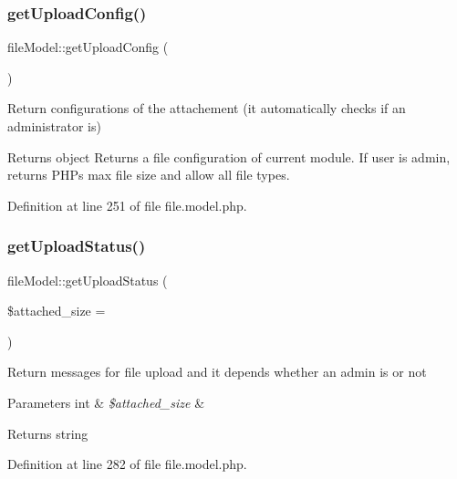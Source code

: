 \subsubsection{\texorpdfstring{get\+Upload\+Config()}{getUploadConfig()}}
{\footnotesize\ttfamily file\+Model\+::get\+Upload\+Config (\begin{DoxyParamCaption}{ }\end{DoxyParamCaption})}

Return configurations of the attachement (it automatically checks if an administrator is)

\begin{DoxyReturn}{Returns}
object Returns a file configuration of current module. If user is admin, returns P\+HP\textquotesingle{}s max file size and allow all file types. 
\end{DoxyReturn}


Definition at line 251 of file file.\+model.\+php.

\hypertarget{classfileModel_a63c3d6b41db33e55521cd3f0b10ab493}{}\label{classfileModel_a63c3d6b41db33e55521cd3f0b10ab493} 
\subsubsection{\texorpdfstring{get\+Upload\+Status()}{getUploadStatus()}}
{\footnotesize\ttfamily file\+Model\+::get\+Upload\+Status (\begin{DoxyParamCaption}\item[{}]{\$attached\+\_\+size = {} }\end{DoxyParamCaption})}

Return messages for file upload and it depends whether an admin is or not


\begin{DoxyParams}[1]{Parameters}
int & {\em \$attached\+\_\+size} & \\
\hline
\end{DoxyParams}
\begin{DoxyReturn}{Returns}
string 
\end{DoxyReturn}


Definition at line 282 of file file.\+model.\+php.

\hypertarget{classfileModel_a5dd9542d5c0ed61a7dd0158900ff5c92}{}\label{classfileModel_a5dd9542d5c0ed61a7dd0158900ff5c92} 
